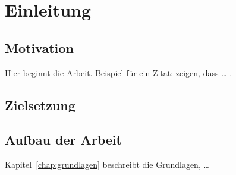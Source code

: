 \chapter{Einleitung}
\label{chap:einleitung}

\section{Motivation}

Hier beginnt die Arbeit. Beispiel für ein Zitat: \textcite{mustermann2024}
zeigen, dass \dots{} \parencite[vgl.][S.~12]{mustermann2024}.

\section{Zielsetzung}

\section{Aufbau der Arbeit}

Kapitel~\ref{chap:grundlagen} beschreibt die Grundlagen, \dots
